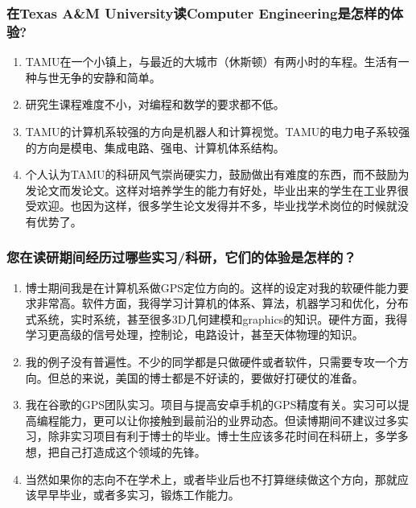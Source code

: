 \documentclass[a4paper,UTF8]{book}
\begin{document}
    \subsubsection*{在Texas A\&M University读Computer Engineering是怎样的体验?}
        \begin{enumerate}[itemindent=0pt,itemsep=0pt,parsep=0pt]
            \item TAMU在一个小镇上，与最近的大城市（休斯顿）有两小时的车程。生活有一种与世无争的安静和简单。
            \item 研究生课程难度不小，对编程和数学的要求都不低。
            \item TAMU的计算机系较强的方向是机器人和计算视觉。TAMU的电力电子系较强的方向是模电、集成电路、强电、计算机体系结构。
            \item 个人认为TAMU的科研风气崇尚硬实力，鼓励做出有难度的东西，而不鼓励为发论文而发论文。这样对培养学生的能力有好处，毕业出来的学生在工业界很受欢迎。也因为这样，很多学生论文发得并不多，毕业找学术岗位的时候就没有优势了。
        \end{enumerate}
    \subsubsection*{您在读研期间经历过哪些实习/科研，它们的体验是怎样的？}
        \begin{enumerate}[itemindent=0pt,itemsep=0pt,parsep=0pt]
            \item 博士期间我是在计算机系做GPS定位方向的。这样的设定对我的软硬件能力要求非常高。软件方面，我得学习计算机的体系、算法，机器学习和优化，分布式系统，实时系统，甚至很多3D几何建模和graphics的知识。硬件方面，我得学习更高级的信号处理，控制论，电路设计，甚至天体物理的知识。
            \item 我的例子没有普遍性。不少的同学都是只做硬件或者软件，只需要专攻一个方向。但总的来说，美国的博士都是不好读的，要做好打硬仗的准备。
            \item 我在谷歌的GPS团队实习。项目与提高安卓手机的GPS精度有关。实习可以提高编程能力，更可以让你接触到最前沿的业界动态。但读博期间不建议过多实习，除非实习项目有利于博士的毕业。博士生应该多花时间在科研上，多学多想，把自己打造成这个领域的先锋。
            \item 当然如果你的志向不在学术上，或者毕业后也不打算继续做这个方向，那就应该早早毕业，或者多实习，锻炼工作能力。
        \end{enumerate}
\end{document}
